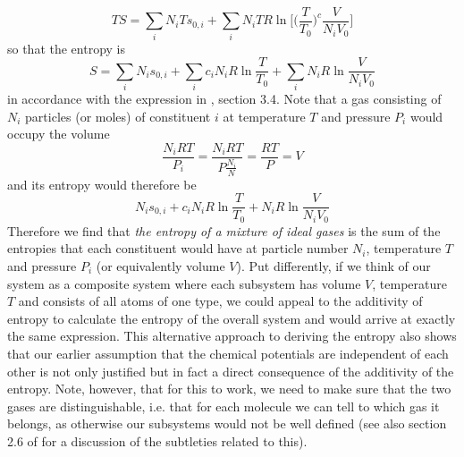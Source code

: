 \documentclass[a4paper, draft]{article}
\theoremstyle{own}
\theoremstyle{remark}
\begin{document}
$$
TS =  \sum_i N_i T s_{0, i} + \sum_i  N_i T R \ln \big[ \big(  \frac{T}{T_0} \big)^{c} \frac{V}{N_i V_0} \big]
$$
so that the entropy is
$$
S = \sum_i N_i  s_{0, i} + \sum_i  c_i N_i R \ln   \frac{T}{T_0}  +  \sum_i  N_i R \ln \frac{V}{N_i V_0} 
$$
in accordance with the expression in \cite{Callen}, section 3.4. Note that a gas consisting of $N_i$ particles (or moles) of constituent $i$ at temperature $T$ and pressure $P_i$ would occupy the volume
$$
\frac{N_i RT}{P_i} = \frac{N_i RT}{P \frac{N_i}{N}} = \frac{RT}{P} = V
$$
and its entropy would therefore be
$$
 N_i  s_{0, i} +  c_i N_i R \ln   \frac{T}{T_0}  +   N_i R \ln \frac{V}{N_i V_0} 
$$
Therefore we find that {\em the entropy of a mixture of ideal gases} is the sum of the entropies that each constituent would have at particle number $N_i$, temperature $T$ and pressure $P_i$ (or equivalently volume $V$). Put differently, if we think of our system as a composite system where each subsystem has volume $V$, temperature $T$ and consists of all atoms of one type, we could appeal to the additivity of entropy to calculate the entropy of the overall system and would arrive at exactly the same expression. This alternative approach to deriving the entropy also shows that our earlier assumption that the chemical potentials are independent of each other is not only justified but in fact a direct consequence of the additivity of the entropy. Note, however, that for this to work, we need to make sure that the two gases are distinguishable, i.e. that for each molecule we can tell to which gas it belongs, as otherwise our subsystems would not be well defined (see also section 2.6 of \cite{Schroeder} for a discussion of the subtleties related to this).
\end{document}
